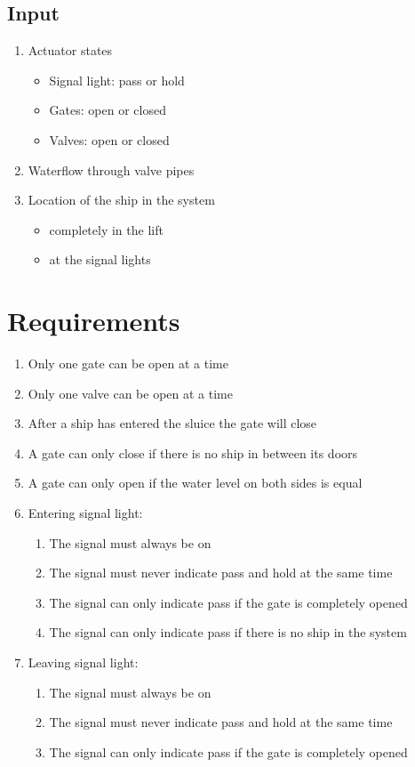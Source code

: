 \documentclass{article}
\begin{document}
\subsection{Input}
\begin{enumerate}
	\item Actuator states
	\begin{itemize}
		\item Signal light: pass or hold
		\item Gates: open or closed
		\item Valves: open or closed
	\end{itemize}
	\item Waterflow through valve pipes
	\item Location of the ship in the system
	\begin{itemize}
		\item completely in the lift
		\item at the signal lights
	\end{itemize}
\end{enumerate}

\section{Requirements}
\begin{enumerate}
	\item Only one gate can be open at a time
	\item Only one valve can be open at a time
	\item After a ship has entered the sluice the gate will close
	\item A gate can only close if there is no ship in between its doors
	\item A gate can only open if the water level on both sides is equal
	\item Entering signal light:
		\begin{enumerate}
			\item The signal must always be on
			\item The signal must never indicate pass and hold at the same time
			\item The signal can only indicate pass if the gate is completely opened
			\item The signal can only indicate pass if there is no ship in the system
		\end{enumerate}
	\item Leaving signal light:
		\begin{enumerate}
			\item The signal must always be on
			\item The signal must never indicate pass and hold at the same time
			\item The signal can only indicate pass if the gate is completely opened
		\end{enumerate}
\end{enumerate}
\end{document}
